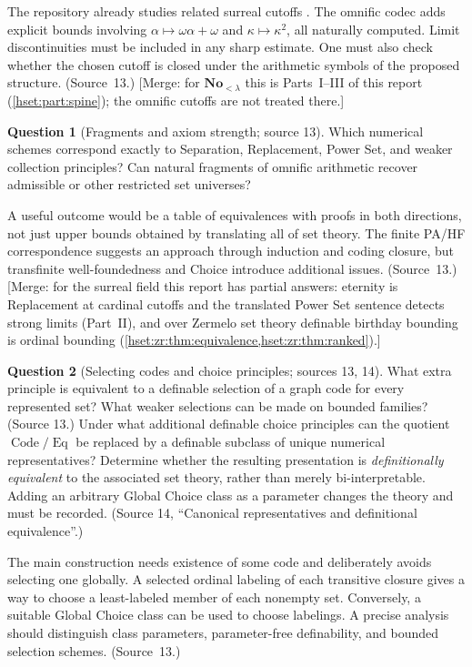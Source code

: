 \documentclass[11pt,letterpaper]{article}
\theoremstyle{definition}
\newtheorem{question}[question]{Question}\aliascntresetthe{question}
\theoremstyle{remark}
\newcommand{\No}{\mathbf{No}}
\newcommand{\Code}{\operatorname{Code}}
\newcommand{\Eqc}{\operatorname{Eq}}
\begin{document}
The repository already studies related surreal cutoffs \cite{ProveItSF13}. The
omnific codec adds explicit bounds involving $\alpha\mapsto\omega\alpha+\omega$ and
$\kappa\mapsto\kappa^2$, all naturally computed. Limit discontinuities must be
included in any sharp estimate. One must also check whether the chosen cutoff is
closed under the arithmetic symbols of the proposed structure. (Source~13.) [Merge:
for $\No_{<\lambda}$ this is Parts~I--III of this report (\cref{hset:part:spine});
the omnific cutoffs are not treated there.]

\begin{question}[Fragments and axiom strength; source 13]\label{hset:sf:q:fragments}
Which numerical schemes correspond exactly to Separation, Replacement, Power Set,
and weaker collection principles? Can natural fragments of omnific arithmetic
recover admissible or other restricted set universes?
\end{question}

A useful outcome would be a table of equivalences with proofs in both directions,
not just upper bounds obtained by translating all of set theory. The finite PA/HF
correspondence suggests an approach through induction and coding closure, but
transfinite well-foundedness and Choice introduce additional issues. (Source~13.)
[Merge: for the surreal field this report has partial answers: eternity is
Replacement at cardinal cutoffs and the translated Power Set sentence detects strong
limits (Part~II), and over Zermelo set theory definable birthday bounding is ordinal
bounding (\cref{hset:zr:thm:equivalence,hset:zr:thm:ranked}).]

\begin{question}[Selecting codes and choice principles; sources 13, 14]\label{hset:sf:q:selection}
What extra principle is equivalent to a definable selection of a graph code for every
represented set? What weaker selections can be made on bounded families?
(Source 13.) Under what additional definable choice principles can the quotient
$\Code/{\Eqc}$ be replaced by a definable subclass of unique numerical
representatives? Determine whether the resulting presentation is
\emph{definitionally equivalent} to the associated set theory, rather than merely
bi-interpretable. Adding an arbitrary Global Choice class as a parameter changes the
theory and must be recorded. (Source 14, ``Canonical representatives and
definitional equivalence''.)
\end{question}

The main construction needs existence of some code and deliberately avoids selecting
one globally. A selected ordinal labeling of each transitive closure gives a way to
choose a least-labeled member of each nonempty set. Conversely, a suitable Global
Choice class can be used to choose labelings. A precise analysis should distinguish
class parameters, parameter-free definability, and bounded selection schemes.
(Source~13.)
\end{document}
